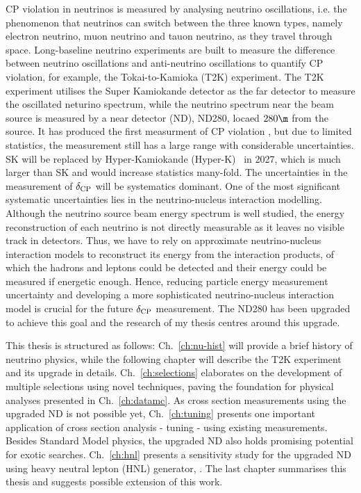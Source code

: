    CP violation in neutrinos is measured by analysing neutrino oscillations, i.e. the phenomenon that neutrinos can switch between the three known types, namely electron neutrino, muon neutrino and tauon neutrino, as they travel through space. 
   Long-baseline neutrino experiments are built to measure the difference between neutrino oscillations and anti-neutrino oscillations to quantify CP violation, for example, the Tokai-to-Kamioka (T2K) experiment. 
   The T2K experiment utilises the Super Kamiokande detector as the far detector to measure the oscillated neturino spectrum, while the neutrino spectrum near the beam source is measured by a near detector (ND), ND280, locaed $280\m$ from the source. 
   It has produced the first measurment of CP violation \cite{T2Knature}, but due to limited statistics, the measurement still has a large range with considerable uncertainties.
   SK will be replaced by Hyper-Kamiokande (Hyper-K)~\cite{Hyper-Kamiokande:2018ofw} in 2027, which is much larger than SK and would increase statistics many-fold. 
   The uncertainties in the measurement of $\delta_\textrm{CP}$ will be systematics dominant. 
   One of the most significant systematic uncertainties lies in the neutrino-nucleus interaction modelling. 
   Although the neutrino source beam energy spectrum is well studied, the energy reconstruction of each neutrino is not directly measurable as it leaves no visible track in detectors. 
   Thus, we have to rely on approximate neutrino-nucleus interaction models to reconstruct its energy from the interaction products, of which the hadrons and leptons could be detected and their energy could be measured if energetic enough. 
   Hence, reducing particle energy measurement uncertainty and developing a more sophisticated neutrino-nucleus interaction model is crucial for the future $\delta_\textrm{CP}$ measurement. 
   The ND280 has been upgraded to achieve this goal and the research of my thesis centres around this upgrade. 

   This thesis is structured as follows: Ch.~\ref{ch:nu-hist} will provide a brief history of neutrino physics, while the following chapter will describe the T2K experiment and its upgrade in details. 
   Ch.~\ref{ch:selections} elaborates on the development of multiple selections using novel techniques, paving the foundation for physical analyses presented in Ch.~\ref{ch:datamc}. 
   As cross section measurements using the upgraded ND is not possible yet, Ch.~\ref{ch:tuning} presents one important application of cross section analysis - tuning - using existing measurements.
   Besides Standard Model physics, the upgraded ND also holds promising potential for exotic searches.
   Ch.~\ref{ch:hnl} presents a sensitivity study for the upgraded ND using heavy neutral lepton (HNL) generator, .
   The last chapter summarises this thesis and suggests possible extension of this work.


